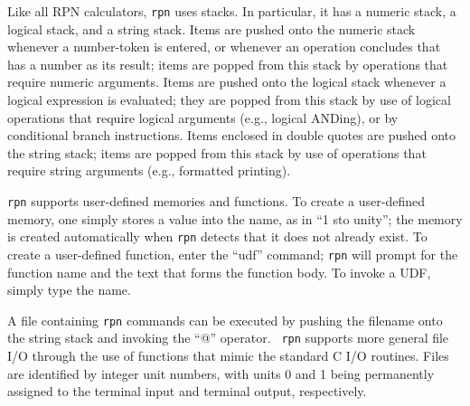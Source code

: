 \documentclass[11pt]{article}
\begin{document}
Like all RPN calculators, {\tt rpn} uses stacks.  In particular, it
has a numeric stack, a logical stack, and a string stack.  Items are
pushed onto the numeric stack whenever a number-token is entered, or
whenever an operation concludes that has a number as its result; items
are popped from this stack by operations that require numeric
arguments.  Items are pushed onto the logical stack whenever a logical
expression is evaluated; they are popped from this stack by use of
logical operations that require logical arguments (e.g., logical
ANDing), or by conditional branch instructions.  Items enclosed in
double quotes are pushed onto the string stack; items are popped from
this stack by use of operations that require string arguments (e.g.,
formatted printing).

{\tt rpn} supports user-defined memories and functions.  To create a
user-defined memory, one simply stores a value into the name, as in
``1 sto unity''; the memory is created automatically when {\tt rpn}
detects that it does not already exist.  To create a user-defined
function, enter the ``udf'' command; {\tt rpn} will prompt for the
function name and the text that forms the function body.  To invoke a
UDF, simply type the name.

A file containing {\tt rpn} commands can be executed by pushing the
filename onto the string stack and invoking the ``@'' operator.  {\tt
rpn} supports more general file I/O through the use of functions that
mimic the standard C I/O routines.  Files are identified by integer
unit numbers, with units 0 and 1 being permanently assigned to the
terminal input and terminal output, respectively.
\end{document}
